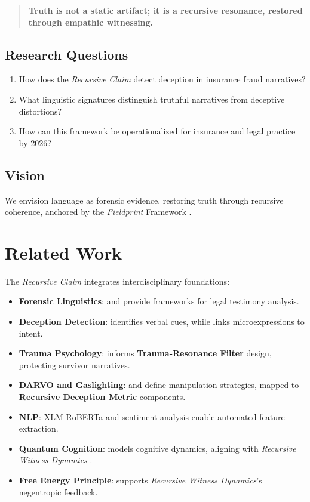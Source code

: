 \documentclass[11pt]{article}
\newcommand{\fieldprint}{\textit{Fieldprint}}
\newcommand{\recursiveclaim}{\textit{Recursive Claim}}
\newcommand{\rdm}{\textbf{Recursive Deception Metric}}
\newcommand{\trf}{\textbf{Trauma-Resonance Filter}}
\newcommand{\rwd}{\textit{Recursive Witness Dynamics}}
\begin{document}
\begin{quote}
\textbf{Truth is not a static artifact; it is a recursive resonance, restored through empathic witnessing.} \citep{havens2025c}
\end{quote}

\subsection{Research Questions}
\begin{enumerate}
    \item How does the \recursiveclaim{} detect deception in insurance fraud narratives?
    \item What linguistic signatures distinguish truthful narratives from deceptive distortions?
    \item How can this framework be operationalized for insurance and legal practice by 2026?
\end{enumerate}

\subsection{Vision}
We envision language as forensic evidence, restoring truth through recursive coherence, anchored by the \fieldprint{} Framework \citep{havens2025b}.

\section{Related Work}
\label{sec:related}
The \recursiveclaim{} integrates interdisciplinary foundations:
\begin{itemize}
    \item \textbf{Forensic Linguistics}: \citet{shuy1993} and \citet{tiersma2002} provide frameworks for legal testimony analysis.
    \item \textbf{Deception Detection}: \citet{vrij2019} identifies verbal cues, while \citet{ekman2001} links microexpressions to intent.
    \item \textbf{Trauma Psychology}: \citet{herman1992} informs \trf{} design, protecting survivor narratives.
    \item \textbf{DARVO and Gaslighting}: \citet{freyd1997} and \citet{sweet2019} define manipulation strategies, mapped to \rdm{} components.
    \item \textbf{NLP}: XLM-RoBERTa \citep{conneau2020} and sentiment analysis \citep{hutto2014} enable automated feature extraction.
    \item \textbf{Quantum Cognition}: \citet{busemeyer2012} models cognitive dynamics, aligning with \rwd{} \citep{havens2025c}.
    \item \textbf{Free Energy Principle}: \citet{friston2010} supports \rwd{}’s negentropic feedback.
\end{itemize}
\end{document}
